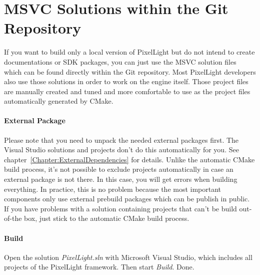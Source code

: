 \section{\ac{MSVC} Solutions within the Git Repository}
If you want to build only a local version of PixelLight but do not intend to create documentations or \ac{SDK} packages, you can just use the \ac{MSVC} solution files which can be found directly within the Git repository. Most PixelLight developers also use those solutions in order to work on the engine itself. Those project files are manually created and tuned and more comfortable to use as the project files automatically generated by CMake.


\paragraph{External Package}
Please note that you need to unpack the needed external packages first. The Visual Studio solutions and projects don't do this automatically for you. See chapter~\ref{Chapter:ExternalDependencies} for details. Unlike the automatic CMake build process, it's not possible to exclude projects automatically in case an external package is not there. In this case, you will get errors when building everything. In practice, this is no problem because the most important components only use external prebuild packages which can be publish in public. If you have problems with a solution containing projects that can't be build out-of-the box, just stick to the automatic CMake build process.


\paragraph{Build}
Open the solution \emph{PixelLight.sln} with Microsoft Visual Studio, which includes all projects of the PixelLight framework. Then start \emph{Build}. Done.

